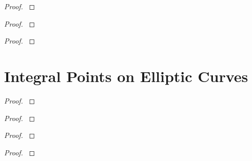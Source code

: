 \documentclass[12pt,reqno]{amsart}
\begin{document}
\begin{exe}\label{8.21}

\begin{proof}\label{s8.21}

\end{proof} 
\end{exe} 

\begin{exe}\label{8.22}

\begin{proof}\label{s8.22}

\end{proof} 
\end{exe} 

\begin{exe}\label{8.23}

\begin{proof}\label{s8.23}

\end{proof} 
\end{exe} 


\newpage
\section{Integral Points on Elliptic Curves}\label{9}
\begin{exe}\label{9.1}

\begin{proof}\label{s9.1}

\end{proof} 
\end{exe} 

\begin{exe}\label{9.2}

\begin{proof}\label{s9.2}

\end{proof} 
\end{exe} 

\begin{exe}\label{9.3}

\begin{proof}\label{s9.3}

\end{proof} 
\end{exe} 

\begin{exe}\label{9.4}	

\begin{proof}\label{s9.4}

\end{proof} 
\end{exe} 
\end{document}
